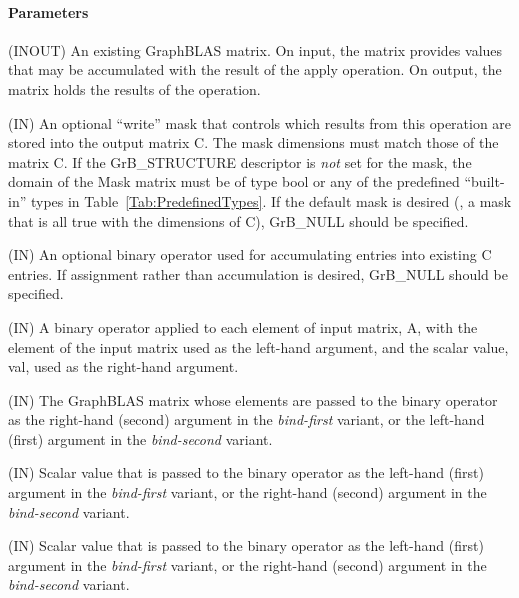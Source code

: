 \paragraph{Parameters}

\begin{itemize}[leftmargin=1.1in]
    \item[{\sf C}]    ({\sf INOUT}) An existing GraphBLAS matrix. On input,
    the matrix provides values that may be accumulated with the result of the
    apply operation.  On output, the matrix holds the results of the
    operation.

    \item[{\sf Mask}] ({\sf IN}) An optional ``write'' mask that controls which
    results from this operation are stored into the output matrix {\sf C}. The 
    mask dimensions must match those of the matrix {\sf C}. If the 
    {\sf GrB\_STRUCTURE} descriptor is {\em not} set for the mask, the domain of the 
    {\sf Mask} matrix must be of type {\sf bool} or any of the predefined 
    ``built-in'' types in Table~\ref{Tab:PredefinedTypes}.  If the default
    mask is desired (\ie, a mask that is all {\sf true} with the dimensions of {\sf C}), 
    {\sf GrB\_NULL} should be specified.

    \item[{\sf accum}] ({\sf IN}) An optional binary operator used for accumulating
    entries into existing {\sf C} entries. If assignment rather than accumulation is
    desired, {\sf GrB\_NULL} should be specified.

    \item[{\sf op}] ({\sf IN}) A binary operator applied to each element of input 
    matrix, {\sf A}, with the element of the input matrix used as the left-hand 
    argument, and the scalar value, {\sf val}, used as the right-hand argument.

    \item[{\sf A}] ({\sf IN})  The GraphBLAS matrix whose elements are passed 
    to the binary operator as the right-hand (second) argument in the 
    {\em bind-first} variant, or the left-hand (first) argument in the 
    {\em bind-second} variant.

    \item[{\sf val}] ({\sf IN}) Scalar value that is passed to the binary operator 
    as the left-hand (first) argument in the {\em bind-first} variant, or 
    the right-hand (second) argument in the {\em bind-second} variant.
    
{\color{red}
    \item[{\sf s}] ({\sf IN}) Scalar value that is passed to the binary operator 
    as the left-hand (first) argument in the {\em bind-first} variant, or 
    the right-hand (second) argument in the {\em bind-second} variant.
}
    

\end{itemize}
